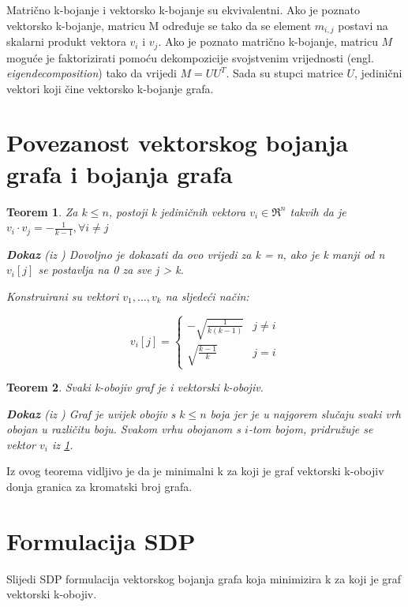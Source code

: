 \documentclass[diplomskirad]{fer}
\newtheorem{theorem}{Teorem}[chapter]
\begin{document}
Matrično k-bojanje i vektorsko k-bojanje su ekvivalentni. Ako je poznato vektorsko k-bojanje, matricu M određuje se tako da se
element $m_{i,j}$ postavi na skalarni produkt vektora $v_i$ i $v_j$. Ako je poznato matrično k-bojanje, matricu $M$ moguće je faktorizirati
pomoću dekompozicije svojstvenim vrijednosti (engl. \textit{eigendecomposition}) tako da vrijedi $M = UU^T$. Sada su stupci matrice $U$, jedinični
vektori koji čine vektorsko k-bojanje grafa. \cite{karger1998approximategraphcoloringsemidefinite}

\section{Povezanost vektorskog bojanja grafa i bojanja grafa}
\begin{theorem}\label{teorem1}
  Za $k \leq n$, postoji k jediničnih vektora $v_i \in \Re^n$ takvih da je $v_i \cdot v_j = -\frac{1}{k-1}, \forall i \neq j$ 

  \textbf{Dokaz} (iz \cite{karger1998approximategraphcoloringsemidefinite}) Dovoljno je dokazati da ovo vrijedi za k = n, ako je k manji od n
  $v_{i}[j]$ se postavlja na 0 za sve j > k.

  Konstruirani su vektori $v_1, \dots, v_k$ na sljedeći način:

  \begin{equation}
    v_i[j] = \begin{cases} -\sqrt{\frac{1}{k(k-1)}} & j \neq i \\ \sqrt{\frac{k-1}{k}} & j = i \end{cases}
  \end{equation}
\end{theorem}

\begin{theorem}
  Svaki k-obojiv graf je i vektorski k-obojiv.

  \textbf{Dokaz} (iz \cite{karger1998approximategraphcoloringsemidefinite}) Graf je uvijek obojiv s $k \leq n$ boja jer je u najgorem slučaju
  svaki vrh obojan u različitu boju. Svakom vrhu obojanom s $i$-tom bojom, pridružuje se vektor $v_i$ iz \ref{teorem1}.
\end{theorem}

Iz ovog teorema vidljivo je da je minimalni k za koji je graf vektorski k-obojiv donja granica za kromatski broj grafa.

\section{Formulacija SDP}
Slijedi SDP formulacija vektorskog bojanja grafa koja minimizira k za koji je graf vektorski k-obojiv.
\end{document}

